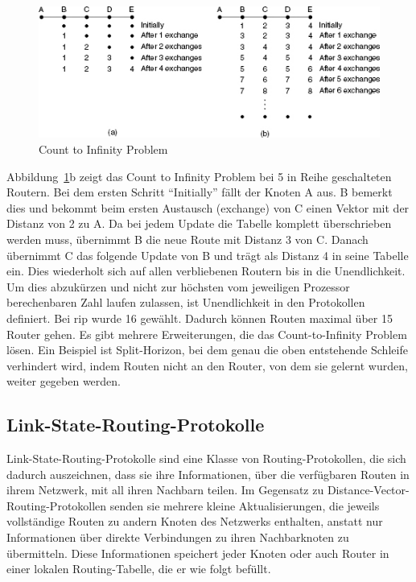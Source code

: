 \documentclass[11pt,a4paper,final]{article}
\begin{document}
\begin{figure}[h]
\includegraphics[width=1.0\textwidth]{images/count_to_inf.png}
\caption[count to inf]{Count to Infinity Problem\footnotemark}
\label{count_to_inf}
\end{figure}
Abbildung~\ref{count_to_inf}b zeigt das Count to Infinity Problem bei 5 in Reihe geschalteten Routern. Bei dem ersten Schritt ``Initially'' fällt der Knoten A aus. B bemerkt dies und bekommt beim ersten Austausch (exchange) von C einen Vektor mit der Distanz von 2 zu A. Da bei jedem Update die Tabelle komplett überschrieben werden muss, übernimmt B die neue Route mit Distanz 3 von C. Danach übernimmt C das folgende Update von B und trägt als Distanz 4 in seine Tabelle ein. Dies wiederholt sich auf allen verbliebenen Routern bis in die Unendlichkeit. Um dies abzukürzen und nicht zur höchsten vom jeweiligen Prozessor berechenbaren Zahl laufen zulassen, ist Unendlichkeit in den Protokollen definiert. Bei \ac{rip} wurde 16 gewählt. Dadurch können Routen maximal über 15 Router gehen. Es gibt mehrere Erweiterungen, die das Count-to-Infinity Problem lösen. Ein Beispiel ist Split-Horizon, bei dem genau die oben entstehende Schleife verhindert wird, indem Routen nicht an den Router, von dem sie gelernt wurden, weiter gegeben werden.

\subsection{Link-State-Routing-Protokolle}
Link-State-Routing-Protokolle sind eine Klasse von Routing-Protokollen, die sich dadurch auszeichnen, dass sie ihre Informationen, über die verfügbaren Routen in ihrem Netzwerk, mit all ihren Nachbarn teilen.
Im Gegensatz zu Distance-Vector-Routing-Protokollen senden sie mehrere kleine Aktualisierungen, die jeweils vollständige Routen zu andern Knoten des Netzwerks enthalten, anstatt nur Informationen über direkte Verbindungen zu ihren Nachbarknoten zu übermitteln.
Diese Informationen speichert jeder Knoten oder auch Router in einer lokalen Routing-Tabelle, die er wie folgt befüllt.
\end{document}
